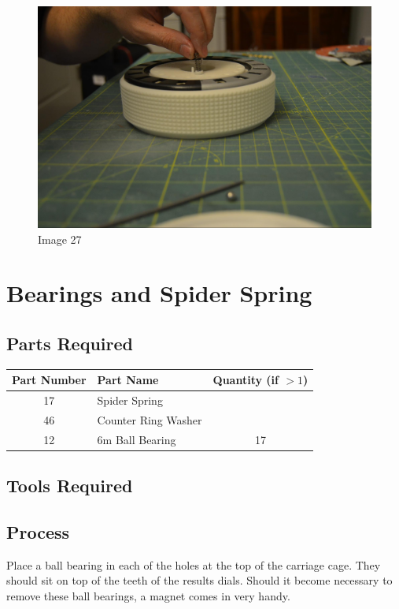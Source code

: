 \documentclass[openany]{book}
\begin{document}
\begin{figure}[!ht]
	\centering
	\includegraphics[width=.75\textwidth]{images/image27.jpg}
	\caption{Image 27}
	\label{fig:image27}	
\end{figure}



\chapter{Bearings and Spider Spring}
\section{Parts Required}
\begin{table}[!ht]
	\centering
	\begin{tabular}{clc}
		Part Number & Part Name & Quantity (if $>1$) \\ \hline
		 17 & Spider Spring & \\ 
		 46 & Counter Ring Washer & \\ \hline \hline 
		 12 & 6m Ball Bearing & 17 
	\end{tabular}
\end{table}


\section{Tools Required}

\section{Process}
Place a ball bearing in each of the holes at the top of the carriage cage. They should sit on top of the teeth of the results dials. Should it become necessary to remove these ball bearings, a magnet comes in very handy.
\end{document}
